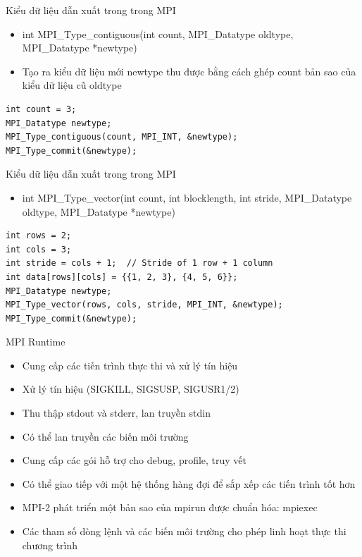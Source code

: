 \documentclass[10pt]{beamer}
\theoremstyle{remark}
\numberwithin{algocf}{section}
\numberwithin{equation}{section}
\numberwithin{dl}{section}
\numberwithin{figure}{section}
\begin{document}
\begin{frame}[fragile]{Kiểu dữ liệu dẫn xuất trong trong MPI}
    \begin{itemize}
        \item int MPI\_Type\_contiguous(int count, MPI\_Datatype oldtype,
                                        MPI\_Datatype *newtype)
        \item Tạo ra kiểu dữ liệu mới newtype thu được bằng cách ghép count bản sao của kiểu dữ liệu cũ oldtype
       
    \end{itemize}
    \begin{verbatim}
int count = 3;
MPI_Datatype newtype;
MPI_Type_contiguous(count, MPI_INT, &newtype);
MPI_Type_commit(&newtype);
    \end{verbatim}
\end{frame}

\begin{frame}[fragile]{Kiểu dữ liệu dẫn xuất trong trong MPI}
    \begin{itemize}
        \item int MPI\_Type\_vector(int count, int blocklength, int stride,
                                    MPI\_Datatype oldtype,
                                    MPI\_Datatype *newtype)
    \end{itemize}

    \begin{verbatim}
int rows = 2;
int cols = 3;
int stride = cols + 1;  // Stride of 1 row + 1 column
int data[rows][cols] = {{1, 2, 3}, {4, 5, 6}};
MPI_Datatype newtype;
MPI_Type_vector(rows, cols, stride, MPI_INT, &newtype);
MPI_Type_commit(&newtype);
    \end{verbatim}
\end{frame}

\begin{frame}{MPI Runtime}
    \begin{itemize}
        \item Cung cấp các tiến trình thực thi và xử lý tín hiệu
        \item Xử lý tín hiệu (SIGKILL, SIGSUSP, SIGUSR1/2)
        \item Thu thập stdout và stderr, lan truyền stdin
        \item Có thể lan truyền các biến môi trường 
        \item Cung cấp các gói hỗ trợ cho debug, profile, truy vết 
        \item Có thể giao tiếp với một hệ thống hàng đợi để sắp xếp các tiến trình tốt hơn
        \item MPI-2 phát triển một bản sao của mpirun được chuẩn hóa: mpiexec
        \item Các tham số dòng lệnh và các biến môi trường cho phép linh hoạt thực thi chương trình
    \end{itemize}
\end{frame}
\end{document}

